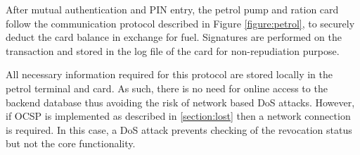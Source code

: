After mutual authentication and PIN entry, the petrol pump and ration card follow the communication protocol described in Figure \ref{figure:petrol}, to securely deduct the card balance in exchange for fuel. Signatures are performed on the transaction and stored in the log file of the card for non-repudiation purpose.

All necessary information required for this protocol are stored locally in the petrol terminal and card. As such, there is no need for online access to the backend database thus avoiding the risk of network based DoS attacks. However, if OCSP is implemented as described in \ref{section:lost} then a network connection is required. In this case, a DoS attack prevents checking of the revocation status but not the core functionality.

\usetikzlibrary{matrix,shapes,arrows,positioning,chains, calc}

